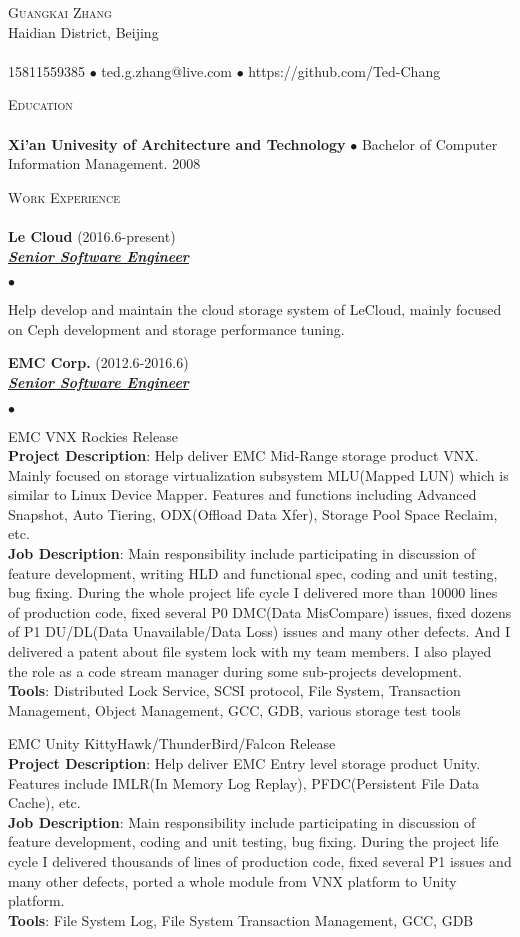 \documentclass{article}
\newcommand{\lineunder}{\vspace*{-8pt} \\ \hspace*{-18pt} \hrulefill \\}
\newcommand{\header}[1]{{\hspace*{-15pt}\vspace*{6pt} \textsc{#1}} \vspace*{-6pt} \lineunder}
\newcommand{\employer}[3]{{ \textbf{#1} (#2)\\ \underline{\textbf{\emph{#3}}}\\}}
\newcommand{\contact}[3]{\vspace*{-8pt} \begin{center}{\LARGE \scshape {#1}}\\ #2 \lineunder
    #3 \end{center} \vspace*{-8pt}
}
\newcommand{\project}[4]{{#1}\\ \textbf{Project Description}:
  {#2}\\ \textbf{Job Description}: {#3}\\ \textbf{Tools}: {#4}\vspace*{3pt}}
\newenvironment{achievements}{\begin{list}{$\bullet$}{\topsep 0pt \itemsep -2pt}}{\vspace*{6pt}\end{list}}
\newcommand{\school}[2]{\textbf{#1} $\bullet$ #2 \vspace*{5pt}}
\begin{document}
\small
\smallskip
\vspace*{-44pt}

\contact{Guangkai Zhang}
{Haidian District, Beijing}
{15811559385 $\bullet$ ted.g.zhang@live.com $\bullet$ https://github.com/Ted-Chang}


\header{Education}
\school{Xi'an Univesity of Architecture and
  Technology}{Bachelor of Computer Information Management. 2008}


\header{Work Experience}
\employer{Le Cloud}{2016.6-present}{Senior Software Engineer}
\begin{achievements}
\item Help develop and maintain the cloud storage system of LeCloud, mainly focused on Ceph development and storage performance tuning.
\end{achievements}

\employer{EMC Corp.}{2012.6-2016.6}{Senior Software Engineer}
\begin{achievements}
\item
  \project{EMC VNX Rockies Release}
          {Help deliver EMC Mid-Range storage product VNX. Mainly focused on storage virtualization subsystem MLU(Mapped LUN) which is similar to Linux Device Mapper. Features and functions including Advanced Snapshot, Auto Tiering, ODX(Offload Data Xfer), Storage Pool Space Reclaim, etc.}
          {Main responsibility include participating in discussion of feature development, writing HLD and functional spec, coding and unit testing, bug fixing. During the whole project life cycle I delivered more than 10000 lines of production code, fixed several P0 DMC(Data MisCompare) issues, fixed dozens of P1 DU/DL(Data Unavailable/Data Loss) issues and many other defects. And I delivered a patent about file system lock with my team members. I also played the role as a code stream manager during some sub-projects development.}
          {Distributed Lock Service, SCSI protocol, File System, Transaction Management, Object Management, GCC, GDB, various storage test tools}

\item
  \project{EMC Unity KittyHawk/ThunderBird/Falcon Release}
          {Help deliver EMC Entry level storage product Unity. Features include IMLR(In Memory Log Replay), PFDC(Persistent File Data Cache), etc.}
          {Main responsibility include participating in discussion of feature development, coding and unit testing, bug fixing. During the project life cycle I delivered thousands of lines of production code, fixed several P1 issues and many other defects, ported a whole module from VNX platform to Unity platform.}
          {File System Log, File System Transaction Management, GCC, GDB}
\end{achievements}
\end{document}
